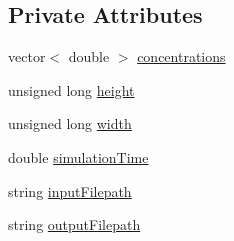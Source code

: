 \subsection*{Private Attributes}
\begin{DoxyCompactItemize}
\item 
vector$<$ double $>$ \hyperlink{classmultiscale_1_1video_1_1CartesianToConcentrationsConverter_a335f54163cbabeaa80c1da811b9f9c0c}{concentrations}
\item 
unsigned long \hyperlink{classmultiscale_1_1video_1_1CartesianToConcentrationsConverter_a94e58072f2e143bd6476133370ffb37f}{height}
\item 
unsigned long \hyperlink{classmultiscale_1_1video_1_1CartesianToConcentrationsConverter_ae6fba5af405d884c7b70ed206a6d5cb1}{width}
\item 
double \hyperlink{classmultiscale_1_1video_1_1CartesianToConcentrationsConverter_a6e66af60b82513b3186fdb32cad44597}{simulation\-Time}
\item 
string \hyperlink{classmultiscale_1_1video_1_1CartesianToConcentrationsConverter_affebbc7e1c67692bd529f19fc0451e58}{input\-Filepath}
\item 
string \hyperlink{classmultiscale_1_1video_1_1CartesianToConcentrationsConverter_a9215448e33876a581b206a89b6651fd0}{output\-Filepath}
\end{DoxyCompactItemize}
